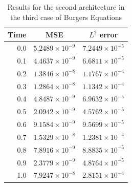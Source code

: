 \documentclass[12pt,letterpaper]{article}
\begin{document}
    \begin{table}[H]
      \begin{center}
      \begin{tabular}{ r | c  c }
      \textbf{Time} & \textbf{MSE} & \textbf{$L^2$ error} \\ \hline
      0.0 & $ 5.2489\times 10^{-9}$ & $ 7.2449\times 10^{-5} $ \\
      0.1 & $ 4.4637\times 10^{-9}$ & $ 6.6811\times 10^{-5} $ \\
      0.2 & $ 1.3846\times 10^{-8}$ & $ 1.1767\times 10^{-4} $ \\
      0.3 & $ 1.2864\times 10^{-8}$ & $ 1.1342\times 10^{-4} $ \\
      0.4 & $ 4.8487\times 10^{-9}$ & $ 6.9632\times 10^{-5} $ \\
      0.5 & $ 2.0942\times 10^{-9}$ & $ 4.5762\times 10^{-5} $ \\
      0.6 & $ 9.1584\times 10^{-9}$ & $ 9.5699\times 10^{-5} $ \\
      0.7 & $ 1.5329\times 10^{-8}$ & $ 1.2381\times 10^{-4} $ \\
      0.8 & $ 7.8916\times 10^{-9}$ & $ 8.8835\times 10^{-5} $ \\
      0.9 & $ 2.3779\times 10^{-9}$ & $ 4.8764\times 10^{-5} $ \\
      1.0 & $ 7.9247\times 10^{-8}$ & $ 2.8151\times 10^{-4} $ \\
      \end{tabular}
      \caption{Results for the second architecture in the third case of Burgers Equations}
      \label{tab:B32}
      \end{center}
  
      \end{table}
\end{document}
